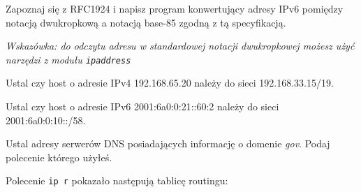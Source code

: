 % 
% 
% 
% 

\dbEntryCheckResults
Zapoznaj się z RFC1924 i napisz program konwertujący adresy IPv6 pomiędzy notacją dwukropkową a notacją base-85 zgodną z tą specyfikacją.

\textit{Wskazówka: do odczytu adresu w standardowej notacji dwukropkowej możesz użyć narzędzi z modułu \texttt{ipaddress}}
\fi


\dbEntryCheckResults
Ustal czy host o adresie IPv4 192.168.65.20 należy do sieci 192.168.33.15/19.
\fi

\dbEntryCheckResults
Ustal czy host o adresie IPv6 2001:6a0:0:21::60:2 należy do sieci 2001:6a0:0:10::/58.
\fi


\dbEntryCheckResults
Ustal adresy serwerów DNS posiadających informację o domenie \emph{gov}. Podaj polecenie którego użyłeś.
\fi

\dbEntryCheckResults
Polecenie \Verb#ip r# pokazało następują tablicę routingu:

